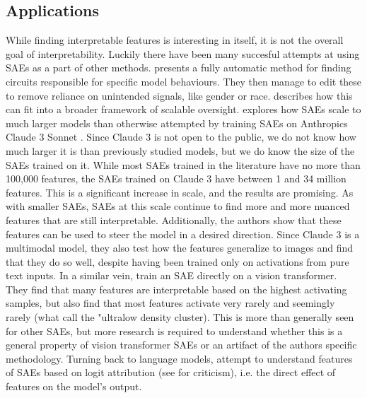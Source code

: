\documentclass[../../main.tex]{subfiles}
\begin{document}
\subsection{Applications}
While finding interpretable features is interesting in itself, it is not the overall goal of interpretability.
Luckily there have been many succesful attempts at using SAEs as a part of other methods.
\citet{marks_sparse_2024} presents a fully automatic method for finding circuits \citep{elhage_mathematical_2021} responsible for specific model behaviours.
They then manage to edit these to remove reliance on unintended signals, like gender or race.
\citet{marks_discriminating_2024} describes how this can fit into a broader framework of scalable oversight.
\citet{templeton_scaling_2024} explores how SAEs scale to much larger models than otherwise attempted by training SAEs on Anthropics Claude 3 Sonnet \citep{anthropic_introducing_nodate}.
Since Claude 3 is not open to the public, we do not know how much larger it is than previously studied models, but we do know the size of the SAEs trained on it.
While most SAEs trained in the literature have no more than 100,000 features, the SAEs trained on Claude 3 have between 1 and 34 million features.
This is a significant increase in scale, and the results are promising.
As with smaller SAEs, SAEs at this scale continue to find more and more nuanced features that are still interpretable.
Additionally, the authors show that these features can be used to steer the model in a desired direction.
Since Claude 3 is a multimodal model, they also test how the features generalize to images and find that they do so well, despite having been trained only on activations from pure text inputs.
In a similar vein, \citet{hugofry_towards_2024} train an SAE directly on a vision transformer.
They find that many features are interpretable based on the highest activating samples, but also find that most features activate very rarely and seemingly rarely (what \cite{bricken_towards_2023} call the "ultralow density cluster).
This is more than generally seen for other SAEs, but more research is required to understand whether this is a general property of vision transformer SAEs or an artifact of the authors specific methodology.
Turning back to language models, \citet{bloom_understanding_2024} attempt to understand features of SAEs based on logit attribution \citep{nostalgebraist_interpreting_2020} (see \citet{dao_adversarial_2023} for criticism), i.e. the direct effect of features on the model's output.
\end{document}
